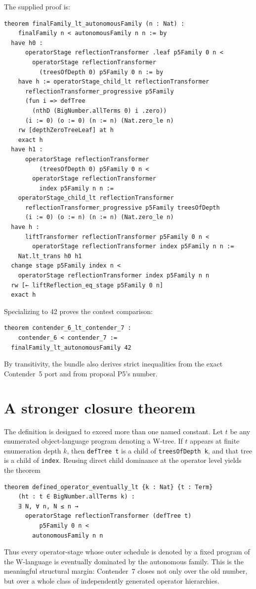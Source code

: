 \documentclass[11pt]{article}
\theoremstyle{definition}
\theoremstyle{remark}
\newcommand{\lean}[1]{\texttt{#1}}
\begin{document}
The supplied proof is:
\begin{lstlisting}
theorem finalFamily_lt_autonomousFamily (n : Nat) :
    finalFamily n < autonomousFamily n n := by
  have h0 :
      operatorStage reflectionTransformer .leaf p5Family 0 n <
        operatorStage reflectionTransformer
          (treesOfDepth 0) p5Family 0 n := by
    have h := operatorStage_child_lt reflectionTransformer
      reflectionTransformer_progressive p5Family
      (fun i => defTree
        (nthD (BigNumber.allTerms 0) i .zero))
      (i := 0) (o := 0) (n := n) (Nat.zero_le n)
    rw [depthZeroTreeLeaf] at h
    exact h
  have h1 :
      operatorStage reflectionTransformer
          (treesOfDepth 0) p5Family 0 n <
        operatorStage reflectionTransformer
          index p5Family n n :=
    operatorStage_child_lt reflectionTransformer
      reflectionTransformer_progressive p5Family treesOfDepth
      (i := 0) (o := n) (n := n) (Nat.zero_le n)
  have h :
      liftTransformer reflectionTransformer p5Family 0 n <
        operatorStage reflectionTransformer index p5Family n n :=
    Nat.lt_trans h0 h1
  change stage p5Family index n <
    operatorStage reflectionTransformer index p5Family n n
  rw [← liftReflection_eq_stage p5Family 0 n]
  exact h
\end{lstlisting}
Specializing to 42 proves the contest comparison:
\begin{lstlisting}
theorem contender_6_lt_contender_7 :
    contender_6 < contender_7 :=
  finalFamily_lt_autonomousFamily 42
\end{lstlisting}
By transitivity, the bundle also derives strict inequalities from the exact
Contender~5 port and from proposal P5's number.

\section{A stronger closure theorem}
\label{sec:closure}

The definition is designed to exceed more than one named constant.  Let \(t\)
be any enumerated object-language program denoting a W-tree.  If \(t\) appears
at finite enumeration depth \(k\), then \lean{defTree t} is a child of
\lean{treesOfDepth k}, and that tree is a child of \lean{index}.  Reusing direct
child dominance at the operator level yields the theorem
\begin{lstlisting}
theorem defined_operator_eventually_lt {k : Nat} {t : Term}
    (ht : t ∈ BigNumber.allTerms k) :
    ∃ N, ∀ n, N ≤ n →
      operatorStage reflectionTransformer (defTree t)
          p5Family 0 n <
        autonomousFamily n n
\end{lstlisting}
Thus every operator-stage whose outer schedule is denoted by a fixed program
of the W-language is eventually dominated by the autonomous family.  This is
the meaningful structural margin: Contender~7 closes not only over the old
number, but over a whole class of independently generated operator hierarchies.
\end{document}
